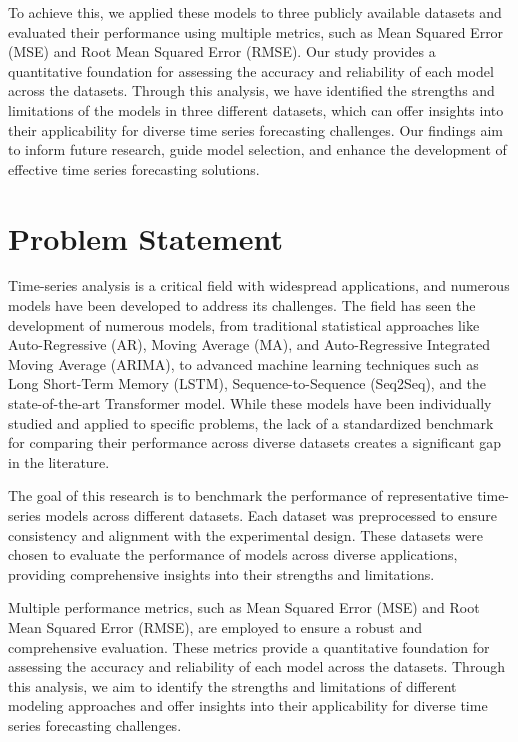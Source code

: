 \documentclass{scrartcl}
\begin{document}
To achieve this, we applied these models to three publicly available datasets and evaluated their performance using multiple metrics, such as Mean Squared Error (MSE) and Root Mean Squared Error (RMSE). Our study provides a quantitative foundation for assessing the accuracy and reliability of each model across the datasets. Through this analysis, we have identified the strengths and limitations of the models in three different datasets, which can offer insights into their applicability for diverse time series forecasting challenges. Our findings aim to inform future research, guide model selection, and enhance the development of effective time series forecasting solutions.



\section{Problem Statement}
Time-series analysis is a critical field with widespread applications, and numerous models have been developed to address its challenges. The field has seen the development of numerous models, from traditional statistical approaches like Auto-Regressive (AR), Moving Average (MA), and Auto-Regressive Integrated Moving Average (ARIMA), to advanced machine learning techniques such as Long Short-Term Memory (LSTM), Sequence-to-Sequence (Seq2Seq), and the state-of-the-art Transformer model. While these models have been individually studied and applied to specific problems, the lack of a standardized benchmark for comparing their performance across diverse datasets creates a significant gap in the literature.

The goal of this research is to benchmark the performance of representative time-series models across different datasets. Each dataset was preprocessed to ensure consistency and alignment with the experimental design. These datasets were chosen to evaluate the performance of models across diverse applications, providing comprehensive insights into their strengths and limitations.

Multiple performance metrics, such as Mean Squared Error (MSE) and Root Mean Squared Error (RMSE), are employed to ensure a robust and comprehensive evaluation. These metrics provide a quantitative foundation for assessing the accuracy and reliability of each model across the datasets. Through this analysis, we aim to identify the strengths and limitations of different modeling approaches and offer insights into their applicability for diverse time series forecasting challenges.
\end{document}
